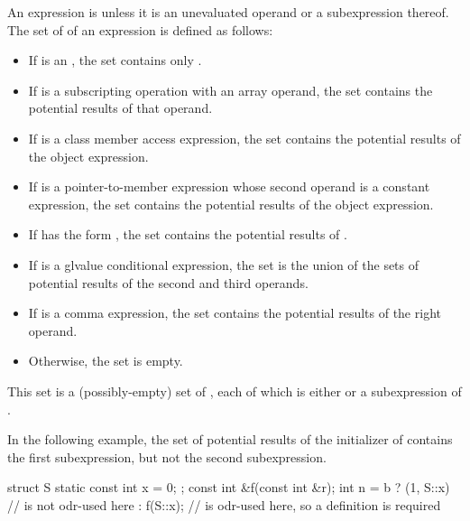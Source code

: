 \pnum
{}%
An expression is  unless it is an
unevaluated operand or a subexpression thereof.
The set of  of an expression  is
defined as follows:
\begin{itemize}
\item If  is an
, the set
contains only .
\item If  is a subscripting operation with
an array operand, the set contains the potential results of that operand.
\item If  is a class member access
expression, the set contains the potential results of
the object expression.
\item If  is a pointer-to-member
expression whose second operand is a constant
expression, the set contains the potential results of the object
expression.
\item If  has the form , the set contains the
potential results of .
\item If  is a glvalue conditional
expression, the set is the union of the sets of
potential results of the second and third operands.
\item If  is a comma expression, the set
contains the potential results of the right operand.
\item Otherwise, the set is empty.
\end{itemize}
\begin{note}
This set is a (possibly-empty) set of ,
each of which is either  or a subexpression of .
\begin{example}
In the following example, the set of potential results of the initializer
of  contains the first  subexpression, but not the second
 subexpression.
\begin{codeblock}
struct S { static const int x = 0; };
const int &f(const int &r);
int n = b ? (1, S::x)           //  is not odr-used here
          : f(S::x);            //  is odr-used here, so a definition is required
\end{codeblock}
\end{example}
\end{note}

